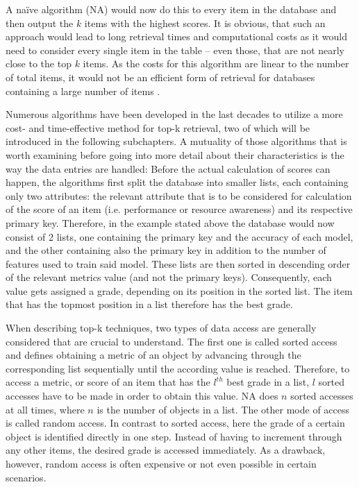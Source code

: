 A naïve algorithm (NA) would now do this to every item in the database and then output the $k$ items with the highest scores. It is obvious, that such an approach would lead to long retrieval times and computational costs as it would need to consider every single item in the table – even those, that are not nearly close to the top $k$ items. As the costs for this algorithm are linear to the number of total items, it would not be an efficient form of retrieval for databases containing a large number of items \cite{fagin2002}.

Numerous algorithms have been developed in the last decades to utilize a more cost- and time-effective method for top-k retrieval, two of which will be introduced in the following subchapters. A mutuality of those algorithms that is worth examining before going into more detail about their characteristics is the way the data entries are handled: Before the actual calculation of scores can happen, the algorithms first split the database into smaller lists, each containing only two attributes: the relevant attribute that is to be considered for calculation of the score of an item (i.e. performance or resource awareness) and its respective primary key. Therefore, in the example stated above the database would now consist of 2 lists, one containing the primary key and the accuracy of each model, and the other containing also the primary key in addition to the number of features used to train said model. These lists are then sorted in descending order of the relevant metrics value (and not the primary keys). Consequently, each value gets assigned a grade, depending on its position in the sorted list. The item that has the topmost position in a list therefore has the best grade.

When describing top-k techniques, two types of data access are generally considered that are crucial to understand. The first one is called sorted access and defines obtaining a metric of an object by advancing through the corresponding list sequentially until the according value is reached. Therefore, to access a metric, or score of an item that has the $l^{th}$ best grade in a list, $l$ sorted accesses have to be made in order to obtain this value. NA does $n$ sorted accesses at all times, where $n$ is the number of objects in a list. The other mode of access is called random access. In contrast to sorted access, here the grade of a certain object is identified directly in one step. Instead of having to increment through any other items, the desired grade is accessed immediately. As a drawback, however, random access is often expensive or not even possible in certain scenarios.

